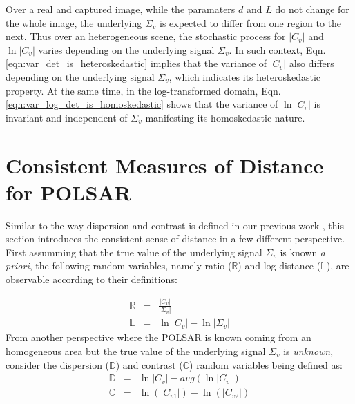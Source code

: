 \documentclass[journal]{IEEEtran}
\begin{document}
Over a real and captured image, while the paramaters $d$ and $L$ do not change for the whole image,
  the underlying $\Sigma_v$ is expected to differ from one region to the next.
Thus over an heterogeneous scene, the stochastic process for $|C_v|$ and $\ln |C_v|$ varies depending on the underlying signal $\Sigma_v$. 
In such context, Eqn. \ref{eqn:var_det_is_heteroskedastic} implies that the variance of $|C_v|$ also differs depending on the underlying signal $\Sigma_v$, which indicates its heteroskedastic property.
At the same time, in the log-transformed domain, Eqn. \ref{eqn:var_log_det_is_homoskedastic} shows that
  the variance of $\ln |C_v|$ is invariant and independent of $\Sigma_v$ manifesting its homoskedastic nature.

\section{Consistent Measures of Distance for POLSAR}
\label{sec:distance_measure}

Similar to the way dispersion and contrast is defined in our previous work \cite{Le_2013_TGRS_SAR_MSE},
  this section introduces the consistent sense of distance in a few different perspective.
First assumming that the true value of the underlying signal $\Sigma_v$ is known \textit{a priori},
the following random variables,
  namely ratio ($\mathbb{R}$) and log-distance ($\mathbb{L}$),
  are observable according to their definitions:

\begin{eqnarray}
  \mathbb{R} &=& \frac{|C_v|}{|\Sigma_v|} \label{eqn:determinant_ratio_observables}\\
  \mathbb{L} &=& \ln|C_v| - \ln|\Sigma_v| \label{eqn:log_distance_observables} 
\end{eqnarray}
From another perspective where the POLSAR is known coming from an homogeneous area but the true value of the underlying signal $\Sigma_v$ is \textit{unknown}, consider the dispersion ($\mathbb{D}$) and contrast ($\mathbb{C}$) random variables being defined as:
\begin{eqnarray}
  \mathbb{D} &=& \ln{|C_v|} - avg(\ln{|C_v|}) \label{eqn:dispersion_observable}\\
  \mathbb{C} &=& \ln(|C_{v1}|) - \ln(|C_{v2}|) \label{eqn:contrast_observable}
\end{eqnarray}
\end{document}
